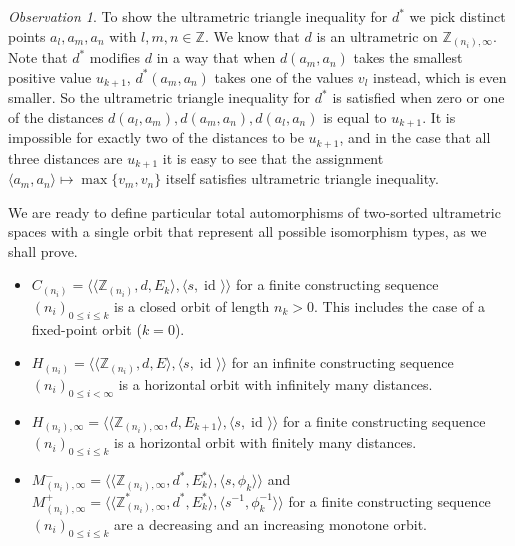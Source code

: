 \documentclass[oneside,notitlepage,12pt]{article}
\theoremstyle{definition}
\theoremstyle{remark}
\newtheorem{observation}[tw]{Observation}
\newcommand \set [1]{\{#1\}}
\newcommand \seq [1]{\langle #1 \rangle}
\newcommand \id [1]{{\operatorname{id}_{#1}}}
\newcommand \Z {\mathbb{Z}}
\begin{document}
\begin{observation}
    To show the ultrametric triangle inequality for $d^*$ we pick distinct points $a_l, a_m, a_n$ with $l, m, n \in \Z$.
    We know that $d$ is an ultrametric on $\Z_{(n_i), \infty}$.
    Note that $d^*$ modifies $d$ in a way that when $d(a_m, a_n)$ takes the smallest positive value $u_{k + 1}$, $d^*(a_m, a_n)$ takes  one of the values $v_l$ instead,  which is even smaller.
    So the ultrametric triangle inequality for $d^*$ is satisfied when zero or one of the distances $d(a_l, a_m), d(a_m, a_n), d(a_l, a_n)$ is equal to $u_{k + 1}$.
    It is impossible for exactly two of the distances to be $u_{k + 1}$, and in the case that all three distances are $u_{k + 1}$ it is easy to see that the assignment $\seq{a_m, a_n} \mapsto \max\set{v_m, v_n}$ itself satisfies ultrametric triangle inequality.
\end{observation}

We are ready to define particular total automorphisms of two-sorted ultrametric spaces with a single orbit that represent all possible isomorphism types, as we shall prove.
\begin{itemize}
    \item $C_{(n_i)} = \seq{\seq{\Z_{(n_i)}, d, E_k}, \seq{s, \id{}}}$ for a finite constructing sequence $(n_i)_{0 \leq i \leq k}$ is a closed orbit of length $n_k > 0$.
    This includes the case of a fixed-point orbit ($k = 0$).
    
    \item $H_{(n_i)} = \seq{\seq{\Z_{(n_i)}, d, E}, \seq{s, \id{}}}$ for an infinite constructing sequence $(n_i)_{0 \leq i < \infty}$ is a horizontal orbit with infinitely many distances.

    \item $H_{(n_i), \infty} = \seq{\seq{\Z_{(n_i), \infty}, d, E_{k + 1}}, \seq{s, \id{}}}$ for a finite constructing sequence $(n_i)_{0 \leq i \leq k}$ is a horizontal orbit with finitely many distances.

    \item $M^-_{(n_i), \infty} = \seq{\seq{\Z_{(n_i), \infty}, d^*, E^*_k}, \seq{s, \phi_k}}$ 
    and $M^+_{(n_i), \infty} = \seq{\seq{\Z^*_{(n_i), \infty}, d^*, E^*_k}, \seq{s^{-1}, \phi_k^{-1}}}$ 
    for a finite constructing sequence $(n_i)_{0 \leq i \leq k}$ are a decreasing and an increasing monotone orbit.
\end{itemize}
\end{document}
